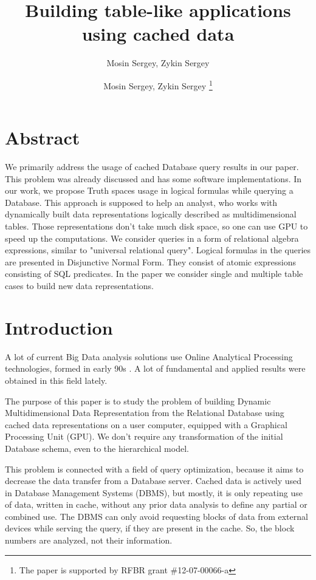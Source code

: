 \documentclass[10pt,a4paper]{article}
\author{Mosin Sergey, Zykin Sergey}
\title{Building table-like applications using cached data}
\author{
Mosin Sergey, Zykin Sergey
\footnote{The paper is supported by RFBR grant \#12-07-00066-a}
}
\begin{document}
\maketitle

\section{Abstract}
We primarily address the usage of cached Database query results in our paper.
This problem was already discussed and has some software implementations. In our
work, we propose Truth spaces usage in logical formulas while querying a Database.
This approach is supposed to help an analyst, who works with dynamically built
data representations logically described as multidimensional tables. Those
representations don't take much disk space, so one can use GPU to speed up the
computations. We consider queries in a form of relational algebra expressions,
similar to "universal relational query". Logical formulas in the queries are
presented in Disjunctive Normal Form. They consist of atomic expressions
consisting of SQL predicates. In the paper we consider single and multiple table
cases to build new data representations.

\section{Introduction}
A lot of current Big Data analysis solutions use Online Analytical Processing
technologies, formed in early 90s \cite{codd}. A lot of fundamental
\cite{lecht,lehner,mazon} and applied \cite{vassi, peder, progressive, giorg}
results were obtained in this field lately.

The purpose of this paper is to study the problem of building Dynamic
Multidimensional Data Representation from the Relational Database using
cached data representations on a user computer, equipped with a Graphical
Processing Unit (GPU). We don't require any transformation of the initial
Database schema, even to the hierarchical model.

This problem is connected with a field of query optimization, because it aims to
decrease the data transfer from a Database server. Cached data is actively
used in Database Management Systems (DBMS), but mostly, it is only repeating use
of data, written in cache, without any prior data analysis to define any partial
or combined use. The DBMS can only avoid requesting blocks of data from external
devices while serving the query, if they are present in the cache. So, the
block numbers are analyzed, not their information.
\end{document}
